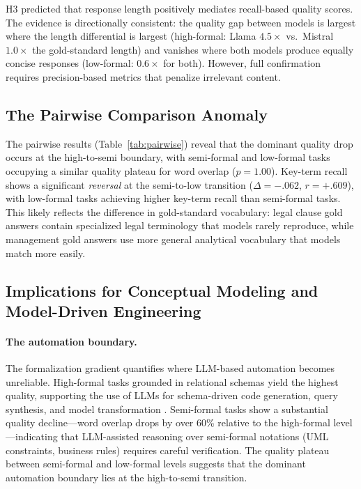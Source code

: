 \documentclass[runningheads]{llncs}
\begin{document}
H3 predicted that response length positively mediates recall-based quality scores. The evidence is directionally consistent: the quality gap between models is largest where the length differential is largest (high-formal: Llama $4.5\times$ vs.\ Mistral $1.0\times$ the gold-standard length) and vanishes where both models produce equally concise responses (low-formal: $0.6\times$ for both). However, full confirmation requires precision-based metrics that penalize irrelevant content.

\subsection{The Pairwise Comparison Anomaly}

The pairwise results (Table~\ref{tab:pairwise}) reveal that the dominant quality drop occurs at the high-to-semi boundary, with semi-formal and low-formal tasks occupying a similar quality plateau for word overlap ($p = 1.00$). Key-term recall shows a significant \emph{reversal} at the semi-to-low transition ($\Delta = -.062$, $r = +.609$), with low-formal tasks achieving higher key-term recall than semi-formal tasks. This likely reflects the difference in gold-standard vocabulary: legal clause gold answers contain specialized legal terminology that models rarely reproduce, while management gold answers use more general analytical vocabulary that models match more easily.

\subsection{Implications for Conceptual Modeling and Model-Driven Engineering}

\paragraph{The automation boundary.}
The formalization gradient quantifies where LLM-based automation becomes unreliable. High-formal tasks grounded in relational schemas yield the highest quality, supporting the use of LLMs for schema-driven code generation, query synthesis, and model transformation \cite{olive2007conceptual}. Semi-formal tasks show a substantial quality decline---word overlap drops by over 60\% relative to the high-formal level---indicating that LLM-assisted reasoning over semi-formal notations (UML constraints, business rules) requires careful verification. The quality plateau between semi-formal and low-formal levels suggests that the dominant automation boundary lies at the high-to-semi transition.
\end{document}
